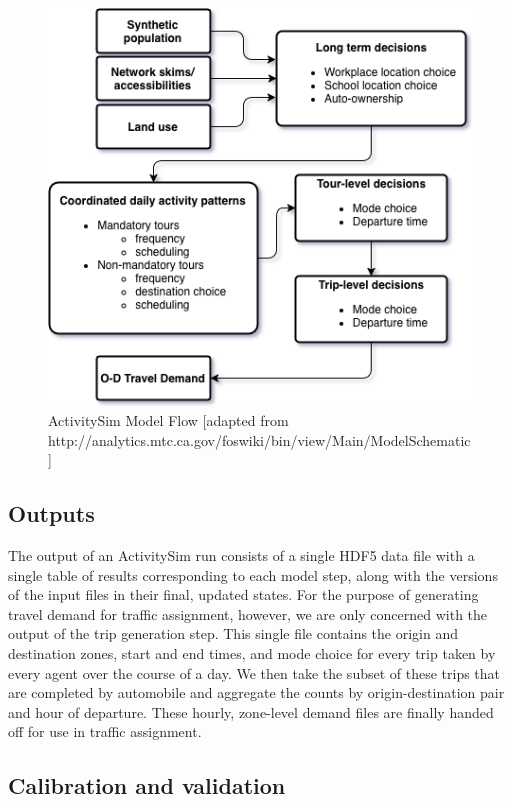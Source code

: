  
\begin{figure}[ht]
\center
 \includegraphics[width=12cm]{graphics/asim_flow.png}
\caption{ActivitySim Model Flow [adapted from http://analytics.mtc.ca.gov/foswiki/bin/view/Main/ModelSchematic]}
\label{fig:asim-models}
\end{figure}
\subsection{Outputs}
The output of an ActivitySim run consists of a single HDF5 data file with a single table of results corresponding to each model step, along with the versions of the input files in their final, updated states. For the purpose of generating travel demand for traffic assignment, however, we are only concerned with the output of the trip generation step. This single file contains the origin and destination zones, start and end times, and mode choice for every trip taken by every agent over the course of a day. We then take the subset of these trips that are completed by automobile and aggregate the counts by origin-destination pair and hour of departure. These hourly, zone-level demand files are finally handed off for use in traffic assignment.

\subsection{Calibration and validation}